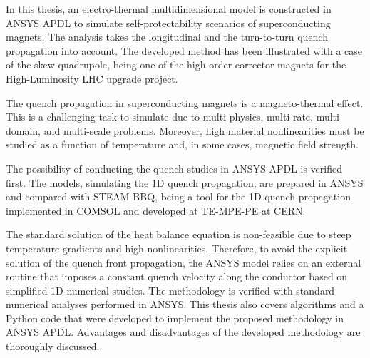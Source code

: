 
In this thesis, an electro-thermal multidimensional model is constructed in ANSYS APDL to simulate self-protectability scenarios of superconducting magnets. The analysis takes the longitudinal and the turn-to-turn quench propagation into account. The developed method has been illustrated with a case of the skew quadrupole, being one of the high-order corrector magnets for the High-Luminosity LHC upgrade project.

The quench propagation in superconducting magnets is a magneto-thermal effect. This is a challenging task to simulate due to multi-physics, multi-rate, multi-domain, and multi-scale problems. Moreover, high material nonlinearities must be studied as a function of temperature and, in some cases, magnetic field strength.

The possibility of conducting the quench studies in ANSYS APDL is verified first. The models, simulating the 1D quench propagation, are prepared in ANSYS and compared with STEAM-BBQ, being a tool for the 1D quench propagation implemented in COMSOL and developed at TE-MPE-PE at CERN. 

The standard solution of the heat balance equation is non-feasible due to steep temperature gradients and high nonlinearities. Therefore, to avoid the explicit solution of the quench front propagation, the ANSYS model relies on an external routine that imposes a constant quench velocity along the conductor based on simplified 1D numerical studies. The methodology is verified with standard numerical analyses performed in ANSYS. This thesis also covers algorithms and a Python code that were developed to implement the proposed methodology in ANSYS APDL. Advantages and disadvantages of the developed methodology are thoroughly discussed.